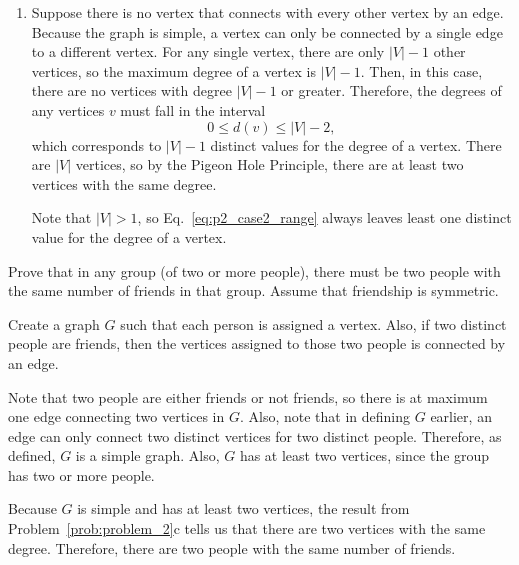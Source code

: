 \documentclass[12pt]{extarticle}
\begin{document}
\begin{sol}
\begin{enumerate}[label=(\alph*)]
\begin{enumerate} [label=\arabic*.]
			            Note that $|V| > 1$, so Eq.~\eqref{eq:p2_case1_range} always leaves least one distinct value for $d(v)$ that we can apply the Pigeon Hole Principle to.
			      \item Suppose there is no vertex that connects with every other vertex by an edge.
			            Because the graph is simple, a vertex can only be connected by a single edge to a different vertex.
			            For any single vertex, there are only $|V|-1$ other vertices, so the maximum degree of a vertex is $|V| - 1$.
			            Then, in this case, there are no vertices with degree $|V| - 1$ or greater.
			            Therefore, the degrees of any vertices $v$ must fall in the interval
			            \begin{equation}
				            0 \leq d(v) \leq |V| - 2, \label{eq:p2_case2_range}
			            \end{equation}
			            which corresponds to $|V| - 1$ distinct values for the degree of a vertex.
			            There are $|V|$ vertices, so by the Pigeon Hole Principle, there are at least two vertices with the same degree.

			            Note that $|V| > 1$, so Eq.~\eqref{eq:p2_case2_range} always leaves least one distinct value for the degree of a vertex.
		      \end{enumerate}
	\end{enumerate}
\end{sol}


\begin{prob} \label{prob:problem_3}
	Prove that in any group (of two or more people), there must be two people with the same number of friends in that group. Assume that friendship is symmetric.
\end{prob}

\begin{sol}
	Create a graph $G$ such that each person is assigned a vertex. Also, if two distinct people are friends, then the vertices assigned to those two people is connected by an edge.

	Note that two people are either friends or not friends, so there is at maximum one edge connecting two vertices in $G$.
	Also, note that in defining $G$ earlier, an edge can only connect two distinct vertices for two distinct people.
	Therefore, as defined, $G$ is a simple graph.
	Also, $G$ has at least two vertices, since the group has two or more people.

	Because $G$ is simple and has at least two vertices, the result from Problem~\ref{prob:problem_2}c tells us that there are two vertices with the same degree.
	Therefore, there are two people with the same number of friends.
\end{sol}
\end{document}
